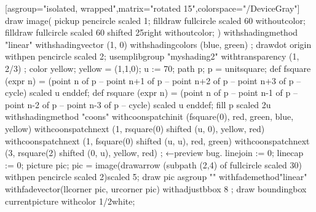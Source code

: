 \documentclass[a4paper]{article}
\begin{document}
\leavevmode
{}[asgroup="isolated, wrapped",matrix="rotated 15",colorspace="/DeviceGray"]
\mpfig[off]
draw image(
  pickup pencircle scaled 1;
  filldraw fullcircle scaled 60 withoutcolor;
  filldraw fullcircle scaled 60 shifted 25right withoutcolor;
)
  withshadingmethod "linear"
  withshadingvector (1, 0)
  withshadingcolors (blue, green) ;
\endmpfig
\endmplibgroup
\mpfig[alt=shading test, adjust-BBox=-10bp 6bp -9bp 14bp, externalizemargin=14bp]
drawdot origin withpen pencircle scaled 2;
usemplibgroup "myshading2" withtransparency (1, 2/3) ;
\endmpfig
\mpfig
color yellow; yellow = (1,1,0);
u := 70;
path p; p = unitsquare;
def fsquare (expr n) =
 (point n of p -- point n+1 of p -- point n+2 of p -- point n+3 of p -- cycle) scaled u
enddef;
def rsquare (expr n) =
 (point n of p -- point n-1 of p -- point n-2 of p -- point n-3 of p -- cycle) scaled u
enddef;
fill p scaled 2u
  withshadingmethod  "coons"
  withcoonspatchinit (fsquare(0), red, green, blue, yellow)
  withcoonspatchnext (1, rsquare(0) shifted (u, 0), yellow, red)
  withcoonspatchnext (1, fsquare(0) shifted (u, u), red,  green)
  withcoonspatchnext (3, rsquare(2) shifted (0, u), yellow, red)
  ;
\endmpfig
←preview bug.
\mpfig[alt=testing the macro withadjustbbox, adjust-BBox=-1bp -8bp 0bp 0bp, externalizemargin=8bp]
  linejoin := 0;  %
  linecap := 0;  %
  picture pic;
  pic = image(drawarrow (subpath (2,4) of fullcircle scaled 30) withpen pencircle scaled 2)scaled 5;
  draw pic
    asgroup ""
    withfademethod"linear"
    withfadevector(llcorner pic, urcorner pic)
    withadjustbbox 8
    ;
draw boundingbox currentpicture withcolor 1/2white;
\endmpfig
\end{document}
